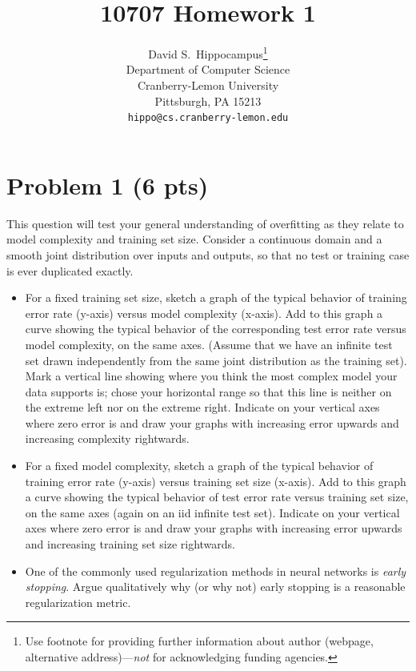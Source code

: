 \documentclass{article}
\title{10707 Homework 1}
\author{
  David S.~Hippocampus\thanks{Use footnote for providing further
    information about author (webpage, alternative
    address)---\emph{not} for acknowledging funding agencies.} \\
  Department of Computer Science\\
  Cranberry-Lemon University\\
  Pittsburgh, PA 15213 \\
  \texttt{hippo@cs.cranberry-lemon.edu} \\
}
\begin{document}

\maketitle


\section*{Problem 1 (6 pts)}
This question will test your general understanding of overfitting 
as they relate to model complexity and training set size. 
Consider a continuous domain and a smooth joint distribution over 
inputs and outputs, so that no test or training case is ever duplicated exactly.
\begin{itemize}
\item 
For a fixed training set size, sketch a graph of the typical 
behavior of training error rate (y-axis) versus model complexity (x-axis).
Add to this graph a curve showing the typical behavior of the corresponding test 
error rate versus model complexity, on the same axes. (Assume that we have an infinite test set drawn independently from the 
same joint distribution as the training set).
Mark a vertical line showing where you think the most complex model 
your data supports is; chose your horizontal range so that this line is 
neither on the extreme left nor on the extreme right. Indicate on your vertical 
axes where zero error is and draw your graphs with increasing error upwards and 
increasing complexity rightwards. \\

\item  For a fixed model complexity, sketch a graph of the typical 
behavior of training error rate (y-axis) versus training set size (x-axis). 
Add to this graph a curve showing the typical behavior of test error rate 
versus training set size, on the same axes
(again on an iid infinite test set). 
Indicate on your vertical axes where zero error is and draw your graphs with increasing error 
upwards and increasing training set size rightwards. \\

\item One of the commonly used regularization methods in neural networks is \emph{early stopping}. Argue qualitatively why (or why not) early stopping is a reasonable regularization metric. 

\end{itemize} 
\end{document}
